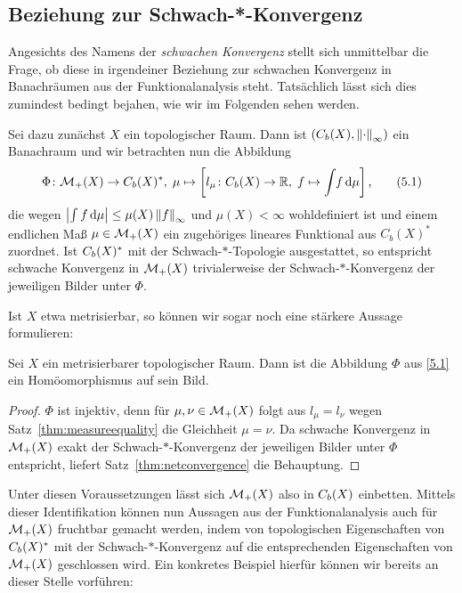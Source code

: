 \documentclass[../main/main.tex]{subfiles}
\begin{document}
	\subsection{Beziehung zur Schwach-*-Konvergenz}
	
	Angesichts des Namens der \emph{schwachen Konvergenz} stellt sich unmittelbar die Frage, ob diese in irgendeiner Beziehung zur schwachen Konvergenz in Banachräumen aus der 
	Funktionalanalysis steht. Tatsächlich lässt sich dies zumindest bedingt bejahen, wie wir im Folgenden sehen werden. 
	
	Sei dazu zunächst $X$ ein topologischer Raum. Dann ist $(C_b(X), \left\lVert\cdot\right\rVert_\infty)$ ein Banachraum und wir betrachten nun die Abbildung
	\[\Phi \colon \mathcal{M}_{+}(X) \to C_b(X)^\ast, \; \mu \mapsto \left[l_\mu \colon C_b(X) \to \mathbb{R}, \; f \mapsto \int_{} \, f \, \mathrm{d}\mu \right]  \text{,} \label{5.1} \tag{5.1}\]
	die wegen $\left| \int_{} \, f \, \mathrm{d}\mu \right| \leq \mu(X) \left\lVert f\right\rVert_\infty$ und $\mu(X) < \infty$ wohldefiniert ist 
	und einem endlichen Maß $\mu \in \mathcal{M}_{+}(X)$ ein zugehöriges lineares Funktional aus $C_b(X)^\ast$ zuordnet. 
	Ist $C_b(X)^\ast$ mit der 
	Schwach-$\ast$-Topologie ausgestattet, so entspricht schwache Konvergenz in $\mathcal{M}_{+}(X)$ trivialerweise der 
	Schwach-$\ast$-Konvergenz der jeweiligen Bilder unter $\Phi$.
	
	Ist $X$ etwa metrisierbar, so können wir sogar noch eine stärkere Aussage formulieren:
	
	\begin{Hilfssatz}
		Sei $X$ ein metrisierbarer topologischer Raum. Dann ist die Abbildung $\Phi$ aus \eqref{5.1} ein Homöomorphismus auf sein Bild.
	\end{Hilfssatz}

	\begin{proof}
		$\Phi$ ist injektiv, denn für $\mu, \nu \in \mathcal{M}_{+}(X)$ folgt aus $l_\mu = l_\nu$ wegen Satz~\ref{thm:measureequality} die Gleichheit $\mu = \nu$. 
		Da schwache Konvergenz in $\mathcal{M}_{+}(X)$ exakt der Schwach-$\ast$-Konvergenz der jeweiligen Bilder unter $\Phi$ entspricht, liefert Satz~\ref{thm:netconvergence}
		die Behauptung.
	\end{proof}

	Unter diesen Voraussetzungen lässt sich $\mathcal{M}_{+}(X)$ also in $C_b(X)$ einbetten. Mittels dieser Identifikation können nun Aussagen aus der 
	Funktionalanalysis auch für $\mathcal{M}_{+}(X)$ fruchtbar gemacht werden, indem von topologischen Eigenschaften von
	$C_b(X)^\ast$ mit der Schwach-$\ast$-Konvergenz auf die entsprechenden Eigenschaften von 
	$\mathcal{M}_{+}(X)$ geschlossen wird. 
	Ein konkretes Beispiel hierfür können wir bereits an dieser Stelle vorführen:
	
\end{document}
